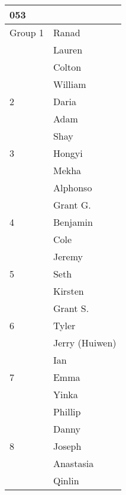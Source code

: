 \documentclass{standalone}
\begin{document}
	\begin{tabular}{l|l}
	053&\\	\hline Group 1
&Ranad\\
&Lauren\\
&Colton\\
&William \\
\hline 2
&Daria\\
&Adam\\
&Shay\\
\hline 3
&Hongyi\\
&Mekha\\
&Alphonso\\
&Grant G.\\
\hline 4
&Benjamin\\
&Cole\\
&Jeremy\\
\hline 5
&Seth\\
&Kirsten\\
&Grant S.\\
\hline 6
&Tyler\\
&Jerry (Huiwen)\\
&Ian\\
\hline 7
&Emma\\
&Yinka\\
&Phillip\\
&Danny\\
\hline 8
&Joseph\\
&Anastasia\\
&Qinlin
\end{tabular}
\end{document}
